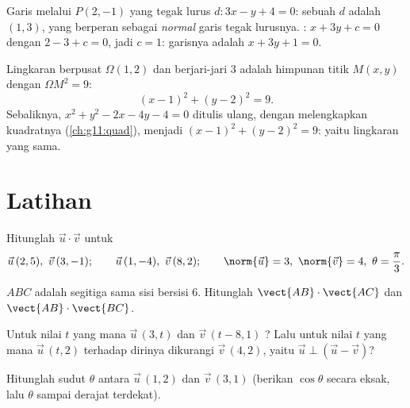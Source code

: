 \begin{example}\label{ex:g11:scal:perpline}
Garis melalui $P(2, -1)$ yang tegak lurus $d : 3x - y + 4 = 0$: sebuah
 $d$ adalah $(1, 3)$, yang berperan sebagai  \emph{normal}
garis tegak lurusnya. : $x + 3y + c = 0$ dengan
$2 - 3 + c = 0$, jadi $c = 1$: garisnya adalah $x + 3y + 1 = 0$.
\end{example}

\begin{example}\label{ex:g11:scal:circle}
Lingkaran berpusat $\Omega(1, 2)$ dan berjari-jari $3$ adalah himpunan titik
$M(x,y)$ dengan $\Omega M^2 = 9$:
\[
(x - 1)^2 + (y - 2)^2 = 9 .
\]
Sebaliknya, $x^2 + y^2 - 2x - 4y - 4 = 0$ ditulis ulang, dengan melengkapkan
kuadratnya (\cref{ch:g11:quad}), menjadi $(x-1)^2 + (y-2)^2 = 9$: yaitu
lingkaran yang sama.
\end{example}

\section{Latihan}

\begin{exercise}[$\star$]\label{exo:g11:scal:1}
Hitunglah $\vec u \cdot \vec v$ untuk
\[
\vec u\,(2, 5),\ \vec v\,(3, -1); \qquad
\vec u\,(1, -4),\ \vec v\,(8, 2); \qquad
\norm{\vec u} = 3,\ \norm{\vec v} = 4,\ \theta = \frac{\pi}{3} .
\]
\end{exercise}

\begin{exercise}[$\star$]\label{exo:g11:scal:2}
$ABC$ adalah segitiga sama sisi bersisi $6$. Hitunglah
$\vect{AB} \cdot \vect{AC}$ dan $\vect{AB} \cdot \vect{BC}$.
\end{exercise}

\begin{exercise}[$\star$]\label{exo:g11:scal:3}
Untuk nilai $t$ yang mana $\vec u\,(3, t)$ dan $\vec v\,(t - 8, 1)$
? Lalu untuk nilai $t$ yang mana $\vec u\,(t, 2)$ 
terhadap dirinya dikurangi $\vec v\,(4, 2)$, yaitu $\vec u \perp (\vec u - \vec v)$?
\end{exercise}

\begin{exercise}[$\star$]\label{exo:g11:scal:4}
Hitunglah sudut $\theta$ antara $\vec u\,(1, 2)$ dan $\vec v\,(3, 1)$
(berikan $\cos\theta$ secara eksak, lalu $\theta$ sampai derajat terdekat).
\end{exercise}

